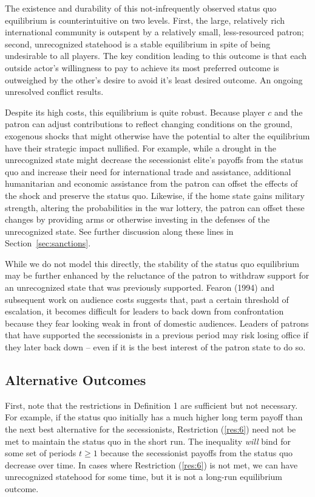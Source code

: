\documentclass[11pt,letterpaper, notitlepage]{article}
\begin{document}
The existence and durability of this not-infrequently observed status quo equilibrium is counterintuitive on two levels. First, the large, relatively rich international community is outspent by a relatively small, less-resourced patron; second, unrecognized statehood is a stable equilibrium in spite of being undesirable to all players. The key condition leading to this outcome is that each outside actor's willingness to pay to achieve its most preferred outcome is outweighed by the other's desire to avoid it's least desired outcome. An ongoing unresolved conflict results.

Despite its high costs, this equilibrium is quite robust. Because player $c$ and the patron can adjust contributions to reflect changing conditions on the ground, exogenous shocks that might otherwise have the potential to alter the equilibrium have their strategic impact nullified. For example, while a drought in the unrecognized state might decrease the secessionist elite's payoffs from the status quo and increase their need for international trade and assistance, additional humanitarian and economic assistance from the patron can offset the effects of the shock and preserve the status quo. Likewise, if the home state gains military strength, altering the probabilities in the war lottery, the patron can offset these changes by providing arms or otherwise investing in the defenses of the unrecognized state. See further discussion along these lines in Section~\ref{sec:sanctions}.

While we do not model this directly, the stability of the status quo equilibrium may be further enhanced by the reluctance of the patron to withdraw support for an unrecognized state that was previously supported. Fearon (1994) and subsequent work on audience costs suggests that, past a certain threshold of escalation, it becomes difficult for leaders to back down from confrontation because they fear looking weak in front of domestic audiences. Leaders of patrons that have supported the secessionists in a previous period may risk losing office if they later back down -- even if it is the best interest of the patron state to do so.  

\subsection{Alternative Outcomes}
\label{sec:alt}

First, note that the restrictions in Definition 1 are sufficient but not necessary. For example, if the status quo initially has a much higher long term payoff than the next best alternative for the secessionists, Restriction (\ref{res:6}) need not be met to maintain the status quo in the short run. The inequality \emph{will} bind for some set of periods $t \geq 1$ because the secessionist payoffs from the status quo decrease over time. In cases where Restriction (\ref{res:6}) is not met, we can have unrecognized statehood for some time, but it is not a long-run equilibrium outcome.
\end{document}
